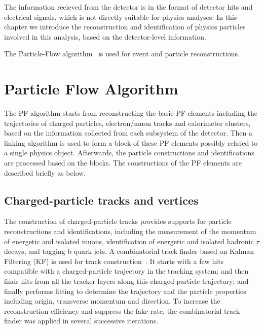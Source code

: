 The information recieved from the detector is in the format of detector hits and electrical signals, which is not directly suitable for physics analyses. In this chapter we introduce the reconstruction and identification of physics particles involved in this analysis, based on the detector-level information. 

\vspace{0.3cm}
The Particle-Flow algorithm~\cite{ob_pf} is used for event and particle reconstructions.

\section{Particle Flow Algorithm}
The PF algorithm starts from reconstructing the basic PF elements including the trajectories of charged particles, electron/muon tracks and calorimeter clusters, based on the information collected from each subsystem of the detector. Then a linking algorithm is used to form a block of these PF elements possibly related to a single physics object. Afterwards, the particle constructions and identifications are processed based on the blocks. The constructions of the PF elements are described briefly as below.

\subsection{Charged-particle tracks and vertices}
The construction of charged-particle tracks provides supports for particle reconstructions and identifications, including the measurement of the momentum of energetic and isolated muons, identification of energetic and isolated hadronic $\tau$ decays, and tagging b quark jets. A combinatorial track finder based on Kalman Filtering (KF) is used for track construction~\cite{ob_trackconst1,ob_trackconst2}. It starts with a few hits compatible with a charged-particle trajectory in the tracking system; and then finds hits from all the tracker layers along this charged-particle trajectory; and finally performs fitting to determine the trajectory and the particle properties including origin, transverse momentum and direction. To increase the reconstruction efficiency and suppress the fake rate, the combinatorial track finder was applied in several successive iterations.

